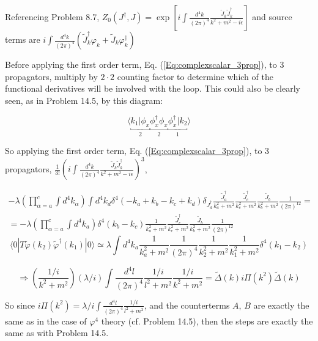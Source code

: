 \documentclass[twoside]{amsart}
\begin{document}
Referencing Problem 8.7, $Z_0(J^{\dag},J) = \exp{ \left[ i \int \frac{ d^4k}{ (2\pi)^4} \frac{ \widetilde{J}_k \widetilde{J}_k^{\dag}}{ k^2 + m^2 - i \epsilon } \right] }$ and source terms are $ i \int \frac{d^4k}{(2\pi)^4} \left( \widetilde{J}_k^{ \dag} \varphi_k + \widetilde{J}_k \varphi^{\dag}_k \right)$

Before applying the first order term, Eq. (\ref{Eq:complexscalar_3prop}), to 3 propagators, multiply by $2 \cdot 2$ counting factor to determine which of the functional derivatives will be involved with the loop.  This could also be clearly seen, as in Problem 14.5, by this diagram:

\[
\langle \underbracket{ k_1 | \phi_x }_2 \underbracket{ \phi_x^{\dag} \phi_x }_{ 2 } \underbracket{ \phi_x^{\dag} | k_2 }_1 \rangle
\]



So applying the first order term, Eq. (\ref{Eq:complexscalar_3prop}), to 3 propagators, $\frac{1}{3!} \left( i \int \frac{ d^4k}{(2\pi)^4} \frac{ \widetilde{J}_k \widetilde{J}_k^{\dag}}{  k^2 + m^2 - i \epsilon } \right)^3$, 

\[
\begin{gathered}
   - \lambda  \left( \prod_{\alpha = a}^c \int d^4k_{\alpha} \right) \int d^4k_d \delta^4(-k_a + k_b - k_c + k_d) \delta_{J_d^{\dag}} \frac{ \widetilde{J}_a^{\dag}}{ k_a^2 + m^2 } \frac{ \widetilde{J}_c^{\dag}}{ k_c^2 + m^2 } \frac{ \widetilde{J}_b}{ k_b^2 + m^2 } \frac{1}{ (2\pi)^{12}} = \\ 
  =  - \lambda \left( \prod_{\alpha = a}^c \int d^4k_a \right) \delta^4(k_b - k_c) \frac{1}{k_a^2 + m^2 } \frac{ \widetilde{J}_c^{\dag} }{ k_c^2 + m^2 } \frac{ \widetilde{J}_b }{ k_b^2 + m^2 } \frac{1}{(2\pi)^{12}}  
  \end{gathered}
\]
\[
\langle 0 | T \widetilde{\varphi}(k_2) \widetilde{\varphi}^{\dag}(k_1) | 0 \rangle \simeq  \lambda \int d^4k_a \frac{1}{k_a^2 + m^2 } \frac{1}{(2\pi)^4} \frac{1}{ k_2^2 + m^2 } \frac{1}{ k_1^2 + m^2} \delta^4(k_1-k_2)
\]

\[
\Longrightarrow \left( \frac{1/i}{ k^2 + m^2 } \right)  (\lambda/i)  \int \frac{d^4l }{ (2\pi)^4} \frac{ 1 /i }{  l^2 + m^2 } \frac{ 1 /i }{ k^2 + m^2 } = \widetilde{\Delta}(k) i \Pi(k^2) \widetilde{\Delta}(k)
\]

So since $i \Pi(k^2) =  \lambda/i \int  \frac{ d^4l}{(2\pi)^4} \frac{ 1 /i }{ l^2 + m^2 }$, and the counterterms $A$, $B$ are exactly the same as in the case of $\varphi^4$ theory (cf. Problem 14.5), then the steps are exactly the same as with Problem 14.5.  
\end{document}
